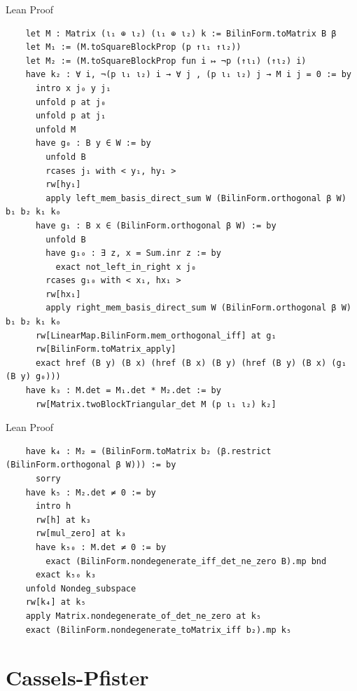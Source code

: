 \documentclass[svgnames]{beamer}
\begin{document}
\begin{frame}[label={sec:orthog_compl},fragile]{Lean Proof}

{\tiny
\begin{verbatim}
    let M : Matrix (ι₁ ⊕ ι₂) (ι₁ ⊕ ι₂) k := BilinForm.toMatrix B β
    let M₁ := (M.toSquareBlockProp (p ↑ι₁ ↑ι₂)) 
    let M₂ := (M.toSquareBlockProp fun i ↦ ¬p (↑ι₁) (↑ι₂) i) 
    have k₂ : ∀ i, ¬(p ι₁ ι₂) i → ∀ j , (p ι₁ ι₂) j → M i j = 0 := by
      intro x j₀ y j₁
      unfold p at j₀
      unfold p at j₁
      unfold M
      have g₀ : B y ∈ W := by
        unfold B 
        rcases j₁ with < y₁, hy₁ > 
        rw[hy₁]
        apply left_mem_basis_direct_sum W (BilinForm.orthogonal β W) b₁ b₂ k₁ k₀
      have g₁ : B x ∈ (BilinForm.orthogonal β W) := by
        unfold B
        have g₁₀ : ∃ z, x = Sum.inr z := by
          exact not_left_in_right x j₀
        rcases g₁₀ with < x₁, hx₁ >
        rw[hx₁]
        apply right_mem_basis_direct_sum W (BilinForm.orthogonal β W) b₁ b₂ k₁ k₀
      rw[LinearMap.BilinForm.mem_orthogonal_iff] at g₁
      rw[BilinForm.toMatrix_apply]
      exact href (B y) (B x) (href (B x) (B y) (href (B y) (B x) (g₁ (B y) g₀)))
    have k₃ : M.det = M₁.det * M₂.det := by
      rw[Matrix.twoBlockTriangular_det M (p ι₁ ι₂) k₂]  

\end{verbatim}
}
\end{frame}

\begin{frame}[label={sec:orthog_compl},fragile]{Lean Proof}

{\tiny
\begin{verbatim} 
    have k₄ : M₂ = (BilinForm.toMatrix b₂ (β.restrict (BilinForm.orthogonal β W))) := by
      sorry
    have k₅ : M₂.det ≠ 0 := by
      intro h
      rw[h] at k₃
      rw[mul_zero] at k₃
      have k₅₀ : M.det ≠ 0 := by
        exact (BilinForm.nondegenerate_iff_det_ne_zero B).mp bnd
      exact k₅₀ k₃
    unfold Nondeg_subspace
    rw[k₄] at k₅
    apply Matrix.nondegenerate_of_det_ne_zero at k₅ 
    exact (BilinForm.nondegenerate_toMatrix_iff b₂).mp k₅ 
\end{verbatim}
}
\end{frame}


\section{Cassels-Pfister}
\end{document}
